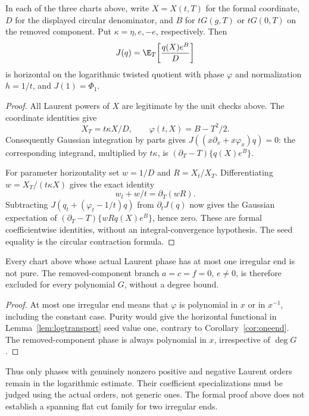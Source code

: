 \begin{lemma}\label{lem:logtransport}
In each of the three charts above, write $X=X(t,T)$ for the formal
coordinate, $D$ for the displayed circular denominator, and $B$ for
$tG(g,T)$ or $tG(0,T)$ on the removed component. Put
$\kappa=\eta,e,-e$, respectively. Then
\[
 J(q)=\E_T\!\left[\frac{q(X)e^B}{D}\right]
\]
is horizontal on the logarithmic twisted quotient with phase
$\varphi$ and normalization $h=1/t$, and $J(1)=\Phi_1$.
\end{lemma}
\begin{proof}
All Laurent powers of $X$ are legitimate by the unit checks above.
The coordinate identities give
\[
 X_T=t\kappa X/D,\qquad
 \varphi(t,X)=B-T^2/2.
\]
Consequently Gaussian integration by parts gives
$J((x\partial_x+x\varphi_x)q)=0$: the corresponding integrand,
multiplied by $t\kappa$, is
$(\partial_T-T)\{q(X)e^B\}$.

For parameter horizontality set $w=1/D$ and $R=X_t/X_T$.
Differentiating $w=X_T/(t\kappa X)$ gives the exact identity
\[
 w_t+w/t=\partial_T(wR).
\]
Subtracting $J(q_t+(\varphi_t-1/t)q)$ from $\partial_tJ(q)$ now
gives the Gaussian expectation of
$(\partial_T-T)\{wR q(X)e^B\}$, hence zero. These are formal
coefficientwise identities, without an integral-convergence hypothesis.
The seed equality is the circular contraction formula.
\end{proof}

\begin{proposition}\label{prop:oneendgaussian}
Every chart above whose actual Laurent phase has at most one
irregular end is not pure. The removed-component branch
$a=c=f=0$, $e\ne0$, is therefore excluded for every polynomial $G$,
without a degree bound.
\end{proposition}
\begin{proof}
At most one irregular end means that $\varphi$ is polynomial in
$x$ or in $x^{-1}$, including the constant case. Purity would give
the horizontal functional in Lemma~\ref{lem:logtransport} seed value
one, contrary to Corollary~\ref{cor:oneend}. The removed-component
phase is always polynomial in $x$, irrespective of $\deg G$.
\end{proof}

Thus only phases with genuinely nonzero positive and negative Laurent
orders remain in the logarithmic estimate. Their coefficient
specializations must be judged using the actual orders, not generic
ones. The formal proof above does not establish a spanning flat cut
family for two irregular ends.

